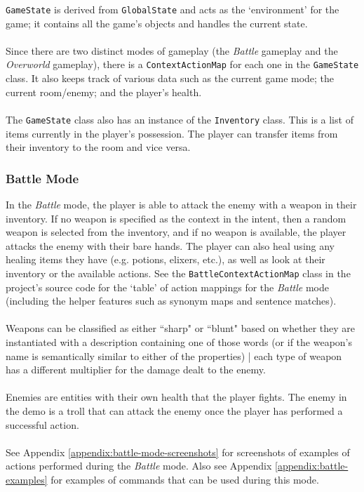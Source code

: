 \documentclass[11pt]{article}
\begin{document}
\texttt{GameState} is derived from \texttt{GlobalState} and acts as the `environment' for the game; it contains all the game's objects and handles the current state.
\\
\\
Since there are two distinct modes of gameplay (the \textit{Battle} gameplay and the \textit{Overworld} gameplay), there is a \texttt{ContextActionMap} for each one in the \texttt{GameState} class. It also keeps track of various data such as the current game mode; the current room/enemy; and the player's health.
\\
\\
The \texttt{GameState} class also has an instance of the \texttt{Inventory} class. This is a list of items currently in the player's possession. The player can transfer items from their inventory to the room and vice versa.

\subsubsection{Battle Mode}

In the \textit{Battle} mode, the player is able to attack the enemy with a weapon in their inventory. If no weapon is specified as the context in the intent, then a random weapon is selected from the inventory, and if no weapon is available, the player attacks the enemy with their bare hands. The player can also heal using any healing items they have (e.g. potions, elixers, etc.), as well as look at their inventory or the available actions. See the \texttt{BattleContextActionMap} class in the project's source code for the `table' of action mappings for the \textit{Battle} mode (including the helper features such as synonym maps and sentence matches).
\\
\\
Weapons can be classified as either ``sharp" or ``blunt" based on whether they are instantiated with a description containing one of those words (or if the weapon's name is semantically similar to either of the properties) | each type of weapon has a different multiplier for the damage dealt to the enemy.
\\
\\
Enemies are entities with their own health that the player fights. The enemy in the demo is a troll that can attack the enemy once the player has performed a successful action.
\\
\\
See Appendix \ref{appendix:battle-mode-screenshots} for screenshots of examples of actions performed during the \textit{Battle} mode. Also see Appendix \ref{appendix:battle-examples} for examples of commands that can be used during this mode.
\end{document}

